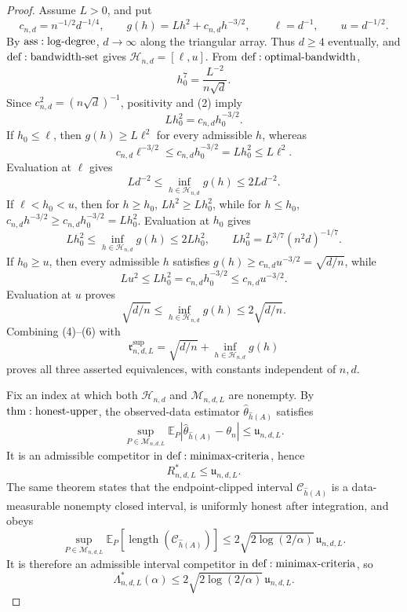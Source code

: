 \documentclass{article}
\begin{document}
\begin{proof}
Assume \(L>0\), and put
\[
 c_{n,d}=n^{-1/2}d^{-1/4},\qquad
 g(h)=Lh^2+c_{n,d}h^{-3/2},\qquad
 \ell=d^{-1},\qquad u=d^{-1/2}.
\tag{1}
\]
By \({\rm ass:log\text{-}degree}\), \(d\to\infty\) along the triangular array.  Thus \(d\geq4\) eventually, and \({\rm def:bandwidth\text{-}set}\) gives \(\mathcal H_{n,d}=[\ell,u]\).  From \({\rm def:optimal\text{-}bandwidth}\),
\[
 h_0^7=\frac{L^{-2}}{n\sqrt d}.
\tag{2}
\]
Since \(c_{n,d}^2=(n\sqrt d)^{-1}\), positivity and (2) imply
\[
 Lh_0^2=c_{n,d}h_0^{-3/2}.
\tag{3}
\]
If \(h_0\leq\ell\), then \(g(h)\geq L\ell^2\) for every admissible \(h\), whereas
\[
 c_{n,d}\ell^{-3/2}
 \leq c_{n,d}h_0^{-3/2}
 =Lh_0^2\leq L\ell^2.
\]
Evaluation at \(\ell\) gives
\[
 Ld^{-2}\leq\inf_{h\in\mathcal H_{n,d}}g(h)\leq2Ld^{-2}.
\tag{4}
\]
If \(\ell<h_0<u\), then for \(h\geq h_0\), \(Lh^2\geq Lh_0^2\), while for \(h\leq h_0\), \(c_{n,d}h^{-3/2}\geq c_{n,d}h_0^{-3/2}=Lh_0^2\).  Evaluation at \(h_0\) gives
\[
 Lh_0^2\leq\inf_{h\in\mathcal H_{n,d}}g(h)\leq2Lh_0^2,
 \qquad
 Lh_0^2=L^{3/7}(n^2d)^{-1/7}.
\tag{5}
\]
If \(h_0\geq u\), then every admissible \(h\) satisfies \(g(h)\geq c_{n,d}u^{-3/2}=\sqrt{d/n}\), while
\[
 Lu^2\leq Lh_0^2=c_{n,d}h_0^{-3/2}
 \leq c_{n,d}u^{-3/2}.
\]
Evaluation at \(u\) proves
\[
 \sqrt{d/n}\leq\inf_{h\in\mathcal H_{n,d}}g(h)
 \leq2\sqrt{d/n}.
\tag{6}
\]
Combining (4)--(6) with
\[
 \mathfrak r^{\mathrm{sup}}_{n,d,L}
 =\sqrt{d/n}+\inf_{h\in\mathcal H_{n,d}}g(h)
\tag{7}
\]
proves all three asserted equivalences, with constants independent of \(n,d\).

Fix an index at which both \(\mathcal H_{n,d}\) and \(\mathcal M_{n,d,L}\) are nonempty.  By \({\rm thm:honest\text{-}upper}\), the observed-data estimator \(\widehat\theta_{\widehat h(A)}\) satisfies
\[
 \sup_{P\in\mathcal M_{n,d,L}}
 \mathbb E_P|\widehat\theta_{\widehat h(A)}-\theta_n|
 \leq\mathfrak u_{n,d,L}.
\tag{8}
\]
It is an admissible competitor in \({\rm def:minimax\text{-}criteria}\), hence
\[
 R^*_{n,d,L}\leq\mathfrak u_{n,d,L}.
\tag{9}
\]
The same theorem states that the endpoint-clipped interval \(\mathcal C_{\widehat h(A)}\) is a data-measurable nonempty closed interval, is uniformly honest after integration, and obeys
\[
 \sup_{P\in\mathcal M_{n,d,L}}
 \mathbb E_P[\operatorname{length}(\mathcal C_{\widehat h(A)})]
 \leq2\sqrt{2\log(2/\alpha)}\,\mathfrak u_{n,d,L}.
\tag{10}
\]
It is therefore an admissible interval competitor in \({\rm def:minimax\text{-}criteria}\), so
\[
 \Lambda^*_{n,d,L}(\alpha)
 \leq2\sqrt{2\log(2/\alpha)}\,\mathfrak u_{n,d,L}.
\tag{11}
\]


\end{proof}
\end{document}
